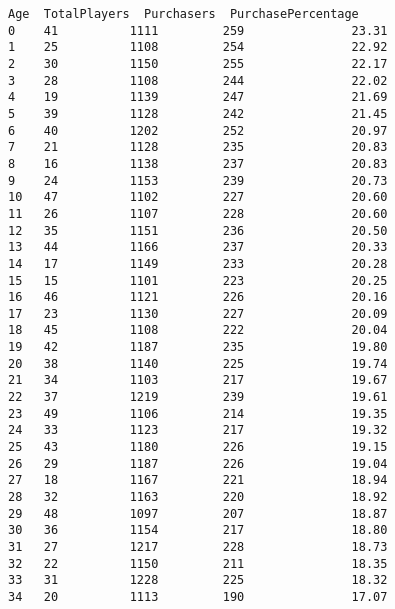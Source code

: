 \documentclass[11pt]{article}
\begin{document}
    \begin{Verbatim}[commandchars=\\\{\}]
    Age  TotalPlayers  Purchasers  PurchasePercentage
0    41          1111         259               23.31
1    25          1108         254               22.92
2    30          1150         255               22.17
3    28          1108         244               22.02
4    19          1139         247               21.69
5    39          1128         242               21.45
6    40          1202         252               20.97
7    21          1128         235               20.83
8    16          1138         237               20.83
9    24          1153         239               20.73
10   47          1102         227               20.60
11   26          1107         228               20.60
12   35          1151         236               20.50
13   44          1166         237               20.33
14   17          1149         233               20.28
15   15          1101         223               20.25
16   46          1121         226               20.16
17   23          1130         227               20.09
18   45          1108         222               20.04
19   42          1187         235               19.80
20   38          1140         225               19.74
21   34          1103         217               19.67
22   37          1219         239               19.61
23   49          1106         214               19.35
24   33          1123         217               19.32
25   43          1180         226               19.15
26   29          1187         226               19.04
27   18          1167         221               18.94
28   32          1163         220               18.92
29   48          1097         207               18.87
30   36          1154         217               18.80
31   27          1217         228               18.73
32   22          1150         211               18.35
33   31          1228         225               18.32
34   20          1113         190               17.07
    \end{Verbatim}
\end{document}
